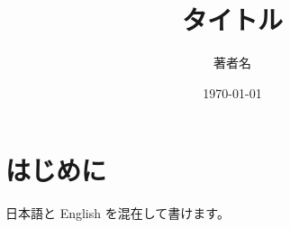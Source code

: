 \documentclass[uplatex,dvipdfmx,a4paper,11pt]{jsarticle}
\title{タイトル}
\author{著者名}
\date{\today}
\begin{document}
\maketitle

\section{はじめに}

日本語と English を混在して書けます。
\end{document}

